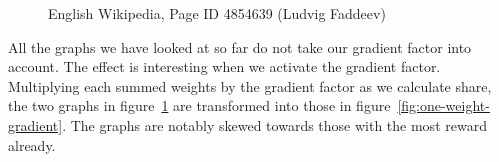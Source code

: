 \begin{figure}
  \caption{English Wikipedia, Page ID 4854639 (Ludvig Faddeev)}
  \label{fig:one-weight}
\end{figure}

All the graphs we have looked at so far do not take our gradient
factor into account. The effect is interesting when we activate the
gradient factor. Multiplying each summed weights by the gradient
factor as we calculate share, the two graphs in
figure~\ref{fig:one-weight} are transformed into those in
figure~\ref{fig:one-weight-gradient}. The graphs are notably skewed
towards those with the most reward already.


